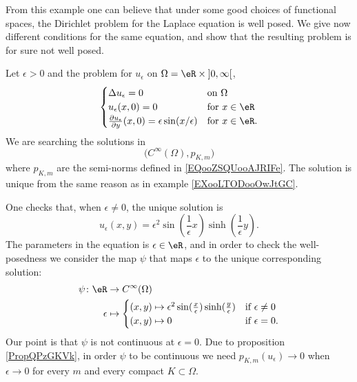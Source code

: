 From this example one can believe that under some good choices of functional spaces, the Dirichlet problem for the Laplace equation is well posed. We give now different conditions for the same equation, and show that the resulting problem is for sure not well posed.

\begin{example}
Let \( \epsilon>0\) and the problem for \( u_{\epsilon}\) on \( \Omega=\eR\times \mathopen] 0 , \infty \mathclose[\),
    \begin{equation}        \label{EQooUBUEooMCDIlZ}
         \begin{cases}
             \Delta u_{\epsilon}=0    &   \text{on } \Omega\\
             u_{\epsilon}(x,0)=0    &    \text{for } x\in \eR \\
             \frac{ \partial u_{\epsilon} }{ \partial y }(x,0)=\epsilon\sin(x/\epsilon)    &    \text{for }x\in \eR.  
         \end{cases}
     \end{equation}
     We are searching the solutions in 
     \begin{equation}
         \big(  C^{\infty}(\Omega),p_{K,m} \big)
     \end{equation}
     where \( p_{K,m}\) are the semi-norms defined in \eqref{EQooZSQUooAJRIFe}. The solution is unique from the same reason as in example \ref{EXooLTODooOwJtGC}.

     One checks that, when \( \epsilon\neq 0\), the unique solution is
     \begin{equation}
         u_{\epsilon}(x,y)=\epsilon^2\sin(\frac{1}{ \epsilon }x)\sinh(\frac{1}{ \epsilon }y).
     \end{equation}
     The parameters in the equation is \( \epsilon\in \eR\), and in order to check the well-posedness we consider the map \( \psi\) that maps \( \epsilon\) to the unique corresponding solution:
     \begin{equation}
         \begin{aligned}
             \psi\colon \eR&\to  C^{\infty}(\Omega) \\
             \epsilon&\mapsto \begin{cases}
                 (x,y)\mapsto \epsilon^2\sin(\frac{ x }{ \epsilon })\sinh(\frac{ y }{ \epsilon })   &   \text{if } \epsilon\neq 0\\
                 (x,y)\mapsto 0 &    \text{if } \epsilon=0.
             \end{cases}
         \end{aligned}
     \end{equation}
     Our point is that \( \psi\) is not continuous at \( \epsilon=0\). Due to proposition \ref{PropQPzGKVk}, in order \( \psi\) to be continuous we need \( p_{K,m}(u_{\epsilon})\to 0\) when \( \epsilon\to 0\) for every \( m\) and every compact \( K\subset \Omega\).


\end{example}
